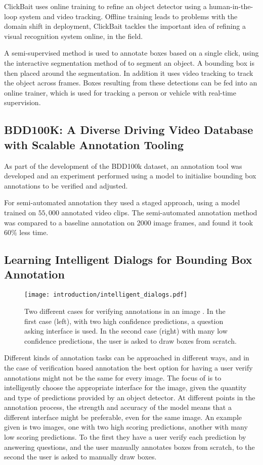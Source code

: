 ClickBait uses online training to refine an object detector using a human-in-the-loop system and video tracking. Offline training leads to problems with the domain shift in deployment, ClickBait tackles the important idea of refining a visual recognition system online, in the field.

A semi-supervised method is used to annotate boxes based on a single click, using the interactive segmentation method of \cite{Xu2016} to segment an object. A bounding box is then placed around the segmentation. In addition it uses video tracking to track the object across frames. Boxes resulting from these detections can be fed into an online trainer, which is used for tracking a person or vehicle with real-time supervision.


\subsection{BDD100K: A Diverse Driving Video Database with
Scalable Annotation Tooling \cite{Yu2018a}}

As part of the development of the BDD100k dataset, an annotation tool was developed and an experiment performed using a model to initialise bounding box annotations to be verified and adjusted. 

For semi-automated annotation they used a staged approach, using a model trained on $55,000$ annotated video clips. The semi-automated annotation method was compared to a baseline annotation on 2000 image frames, and found it took $60\%$ less time.

\subsection{Learning Intelligent Dialogs for Bounding Box Annotation}

\begin{figure}[h]
  \centering
  \texttt{[image: introduction/intelligent\_dialogs.pdf]}
  \caption{Two different cases for verifying annotations in an image \cite{Konyushkova2017}. In the first case (left), with two high confidence predictions, a question asking interface is used. In the second case (right) with many low confidence predictions, the user is asked to draw boxes from scratch. }
  \label{fig:intelligent_dialogs}
\end{figure}

Different kinds of annotation tasks can be approached in different ways, and in the case of verification based annotation the best option for having a user verify annotations might not be the same for every image. The focus of \cite{Konyushkova2017} is to intelligently choose the appropriate interface for the image, given the quantity and type of predictions provided by an object detector. At different points in the annotation process, the strength and accuracy of the model means that a different interface might be preferable, even for the same image. An example given is two images, one with two high scoring predictions, another with many low scoring predictions. To the first they have a user  verify each prediction by answering questions, and the user manually annotates boxes from scratch, to the second the user is asked to manually draw boxes. 


